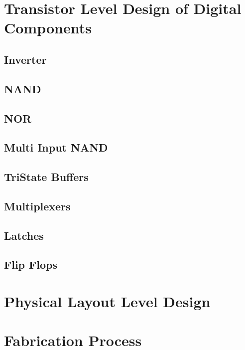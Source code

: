 \documentclass[•]{article}
\begin{document}
\section{Transistor Level Design of Digital Components}
\subsection{Inverter}
\subsection{NAND}
\subsection{NOR}
\subsection{Multi Input NAND}
\subsection{TriState Buffers}
\subsection{Multiplexers}
\subsection{Latches}
\subsection{Flip Flops}

\section{Physical Layout Level Design}

\section{Fabrication Process}
\end{document}
